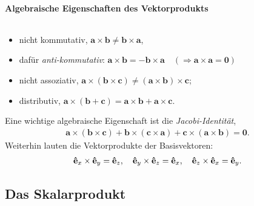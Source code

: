 \paragraph{Algebraische Eigenschaften des Vektorprodukts}$~$

\begin{itemize}
    \item nicht kommutativ, $\bm{a}\times \bm{b} \neq \bm{b} \times \bm{a}$, 
    \item dafür \emph{anti-kommutativ}: $\bm{a}\times\bm{b} = - \bm{b}\times \bm{a} \quad (\Rightarrow \bm{a}\times\bm{a} = \bm{0})$
    \item nicht assoziativ, $\bm{a}\times (\bm{b}\times \bm{c}) \neq (\bm{a}\times\bm{b})\times\bm{c}$; 
    \item distributiv, $\bm{a} \times (\bm{b}+\bm{c}) = \bm{a}\times\bm{b} + \bm{a}\times \bm{c}.$
\end{itemize}

Eine wichtige algebraische Eigenschaft ist die \emph{Jacobi-Identität}, 
\begin{align}
    \bm{a} \times (\bm{b}\times\bm{c}) + \bm{b} \times (\bm{c}\times\bm{a}) + \bm{c}\times (\bm{a}\times\bm{b}) = \bm{0}.
\end{align}
Weiterhin lauten die Vektorprodukte der Basisvektoren: 
\begin{align}
    \vu{e}_x \times \vu{e}_y = \vu{e}_z, \quad \vu{e}_y \times \vu{e}_z = \vu{e}_x, \quad \vu{e}_z \times \vu{e}_x = \vu{e}_y.
\end{align}


\subsection{Das Skalarprodukt}

